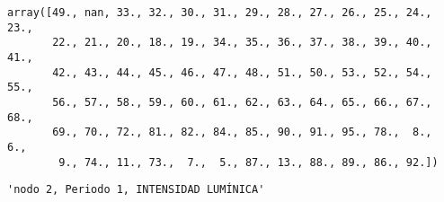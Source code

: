 \documentclass[11pt]{article}
\begin{document}
    
    
    \begin{verbatim}
array([49., nan, 33., 32., 30., 31., 29., 28., 27., 26., 25., 24., 23.,
       22., 21., 20., 18., 19., 34., 35., 36., 37., 38., 39., 40., 41.,
       42., 43., 44., 45., 46., 47., 48., 51., 50., 53., 52., 54., 55.,
       56., 57., 58., 59., 60., 61., 62., 63., 64., 65., 66., 67., 68.,
       69., 70., 72., 81., 82., 84., 85., 90., 91., 95., 78.,  8.,  6.,
        9., 74., 11., 73.,  7.,  5., 87., 13., 88., 89., 86., 92.])
    \end{verbatim}

    
    
    \begin{verbatim}
'nodo 2, Periodo 1, INTENSIDAD LUMÍNICA'
    \end{verbatim}

    
    
\end{document}
